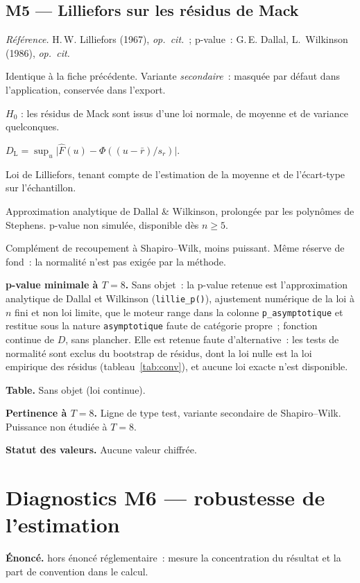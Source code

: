 \documentclass[a4paper,11pt]{article}
\newcommand{\code}[1]{\texttt{\small #1}}
\newcommand{\refl}[1]{{\small\textcolor{maincolor!70!black}{\textit{Référence.} #1}}\par\smallskip}
\newcounter{ficheid}
\newenvironment{fiche}[1]{%
  \stepcounter{ficheid}%
  \phantomsection
  \subsection{#1}%
  \label{fiche:\theficheid}%
}{%
  \end{description}\vspace{0.5em}%
}
\newcommand{\Cadre}{%
  \begin{description}[leftmargin=0pt, style=unboxed, itemsep=3pt, topsep=3pt, parsep=2pt]%
  \item[\textcolor{financeblue}{\textbf{1. Cadre, notations et hypothèses de validité (non testées).}}]}
\newcommand{\Hzero}{\item[\textcolor{financeblue}{\textbf{2. Hypothèse nulle.}}]}
\newcommand{\Stat}{\item[\textcolor{financeblue}{\textbf{3. Statistique de test.}}]}
\newcommand{\Loi}{\item[\textcolor{financeblue}{\textbf{4. Loi sous $H_0$.}}]}
\newcommand{\Pval}{\item[\textcolor{financeblue}{\textbf{5. p-value.}}]}
\newcommand{\Usage}{\item[\textcolor{financeblue}{\textbf{6. Usage et limites.}}]}
\newcommand{\Pertinence}{\item[\textcolor{financeblue}{\textbf{7. Pertinence et puissance à faible $T$.}}]}
\begin{document}
\begin{fiche}{M5 --- Lilliefors sur les résidus de Mack}
\label{mw:m5li}
\refl{H.\,W. Lilliefors (1967), \emph{op.\ cit.}~; p-value~: G.\,E. Dallal,
L.~Wilkinson (1986), \emph{op.\ cit.}}
\Cadre
Identique à la fiche précédente. Variante \emph{secondaire}~: masquée par défaut
dans l'application, conservée dans l'export.
\Hzero
$H_0$ : les résidus de Mack sont issus d'une loi normale, de moyenne et de
variance quelconques.
\Stat
$D_{\mathrm{L}} = \sup_u \big|\hat F(u) - \Phi((u - \bar r)/s_r)\big|$.
\Loi
Loi de Lilliefors, tenant compte de l'estimation de la moyenne et de
l'écart-type sur l'échantillon.
\Pval
Approximation analytique de Dallal \& Wilkinson, prolongée par les polynômes de
Stephens. p-value non simulée, disponible dès $n \ge 5$.
\Usage
Complément de recoupement à Shapiro--Wilk, moins puissant. Même réserve de fond~:
la normalité n'est pas exigée par la méthode.
\Pertinence
\textbf{p-value minimale à $T = 8$.} Sans objet~: la p-value retenue est l'approximation analytique de Dallal et Wilkinson (\code{lillie\_p()}), ajustement numérique de la loi à $n$ fini et non loi limite, que le moteur range dans la colonne \code{p\_asymptotique} et restitue sous la nature \code{asymptotique} faute de catégorie propre~; fonction continue de $D$, sans plancher. Elle est retenue faute d'alternative~: les tests de normalité sont exclus du bootstrap de résidus, dont la loi nulle est la loi empirique des résidus (tableau~\ref{tab:conv}), et aucune loi exacte n'est disponible.

\textbf{Table.} Sans objet (loi continue).

\textbf{Pertinence à $T = 8$.} Ligne de type test, variante secondaire de Shapiro--Wilk. Puissance non étudiée à $T = 8$.

\textbf{Statut des valeurs.} Aucune valeur chiffrée.
\end{fiche}

\clearpage
\section{Diagnostics M6 --- robustesse de l'estimation}
\label{sec:mwm6}

\begin{encadre}
\textbf{Énoncé.} hors énoncé réglementaire~: mesure la concentration du résultat et la part de convention dans le calcul.
\end{encadre}
\end{document}
